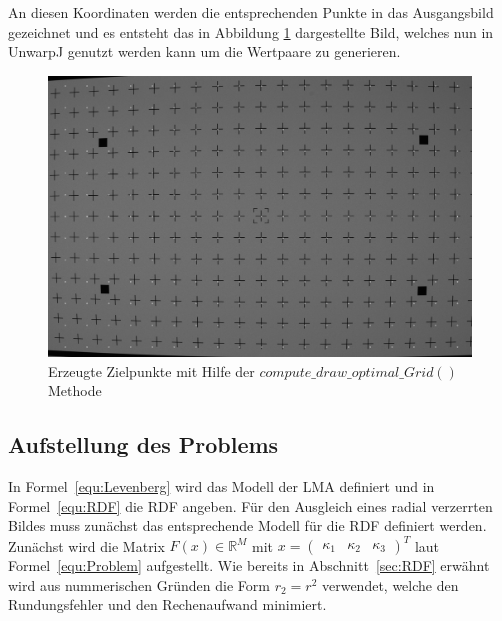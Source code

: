 An diesen Koordinaten werden die entsprechenden Punkte in das Ausgangsbild gezeichnet und es entsteht das in Abbildung \ref{fig:gitter-optimal} dargestellte Bild, welches nun in UnwarpJ genutzt werden kann um die Wertpaare zu generieren.

\begin{figure}
\includegraphics[width=\textwidth]{Images/optimales-gitter.png}
\caption{Erzeugte Zielpunkte mit Hilfe der $compute\_draw\_optimal\_Grid()$ Methode}
\label{fig:gitter-optimal}
\end{figure}

\subsection{Aufstellung des Problems}
\label{sec:Problem}

In Formel~\ref{equ:Levenberg} wird das Modell der LMA definiert und in Formel~\ref{equ:RDF} die RDF angeben. 
Für den Ausgleich eines radial verzerrten Bildes muss zunächst das entsprechende Modell für die RDF definiert werden. Zunächst wird die Matrix $F(x) \in \mathbb{R}^M$ mit $x = \begin{pmatrix}
\kappa_1 & \kappa_2 & \kappa_3\end{pmatrix}^T$ laut Formel~\ref{equ:Problem} aufgestellt. Wie bereits in Abschnitt~\ref{sec:RDF} erwähnt wird aus nummerischen Gründen die Form $r_2 = r^2$ verwendet, welche den Rundungsfehler und den Rechenaufwand minimiert. 

